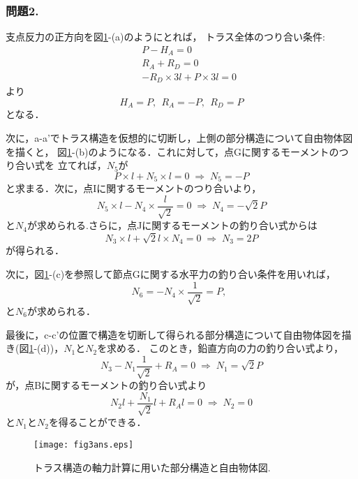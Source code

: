 \documentclass[10pt,a4j]{jarticle}
\begin{document}
\subsubsection*{問題2.}
支点反力の正方向を図\ref{fig:fig3}-(a)のようにとれば，
トラス全体のつり合い条件:
\begin{eqnarray}
	&& P-H_A=0  \\
	&& R_A+R_D=0 \\  
	&& -R_D\times 3l + P \times 3l=0 
\end{eqnarray}
より
\begin{equation}
	H_A=P, \ \ 
	R_A=-P, \ \ 
	R_D=P
\end{equation}
となる．

次に，a-a'でトラス構造を仮想的に切断し，上側の部分構造について自由物体図を描くと，
図\ref{fig:fig3}-(b)のようになる．これに対して，点Gに関するモーメントのつり合い式を
立てれば，$N_5$が
\begin{equation}
	P\times l +N_5\times l=0
	\; \Rightarrow \;
	N_5=-P
\end{equation}
と求まる．次に，点Iに関するモーメントのつり合いより，
\begin{equation}
	N_5\times l -N_4\times \frac{l}{\sqrt{2}}=0
	\; \Rightarrow \;
	N_4=-\sqrt{2}P
\end{equation}
と$N_4$が求められる.さらに，点Jに関するモーメントの釣り合い式からは
\begin{equation}
	N_3\times l +\sqrt{2}l\times N_4 =0
	\; \Rightarrow \;
	N_3=2P
\end{equation}
が得られる．

次に，図\ref{fig:fig3}-(c)を参照して節点Gに関する水平力の釣り合い条件を用いれば，
\begin{equation}
	N_6=-N_4\times \frac{1}{\sqrt{2}}=P, \ \ 
\end{equation}
と$N_6$が求められる．

最後に，c-c'の位置で構造を切断して得られる部分構造について自由物体図を描き(図\ref{fig:fig3}-(d))，$N_1$と$N_2$を求める．
このとき，鉛直方向の力の釣り合い式より，
\begin{equation}
	N_3-N_1\frac{1}{\sqrt{2}}+R_A=0 \; \Rightarrow \; N_1=\sqrt{2}P
\end{equation}
が，点Bに関するモーメントの釣り合い式より
\begin{equation}
	N_2l+\frac{N_1}{\sqrt{2}}l +R_Al=0 \; \Rightarrow \; N_2=0
\end{equation}
と$N_1$と$N_2$を得ることができる．
\begin{figure}[h]
	\begin{center}
	\texttt{[image: fig3ans.eps]} 
	\end{center}
	\caption{トラス構造の軸力計算に用いた部分構造と自由物体図.} 
	\label{fig:fig3}
\end{figure}
\end{document}
